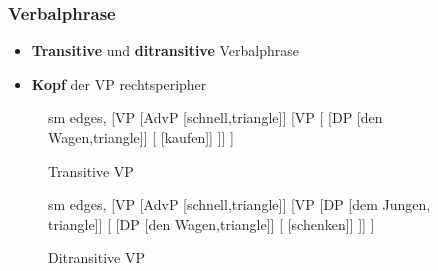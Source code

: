 \begin{frame}
\frametitle{Verbalphrase}

\begin{itemize}
	\item \textbf{Transitive} und \textbf{ditransitive} Verbalphrase
	\item \textbf{Kopf} der VP \ras rechtsperipher 
\end{itemize}

\begin{figure}[b]
	\begin{minipage}[b]{0.43\textwidth}
	\centering
	\small{
		\begin{forest}
		sm edges,
		[VP [AdvP [schnell,triangle]]
			[VP 
		    [	[DP [den Wagen,triangle]]				
		    			[ [kaufen]]
			]]
		]			 
		\end{forest}
		}
		\caption{Transitive VP}	
  	\end{minipage} 
	\begin{minipage}[b]{0.52\textwidth}
	\centering
	\small{
		\begin{forest}
		sm edges,
		[VP [AdvP [schnell,triangle]]
			[VP 
				[DP [dem Jungen, triangle]]
				[\MyPxbar{V}	
					[DP [den Wagen,triangle]]				
		    		[ [schenken]]
			]]
		]			 
		\end{forest}
		}
		\caption{Ditransitive VP}	
  	\end{minipage}
\end{figure}

\end{frame}


